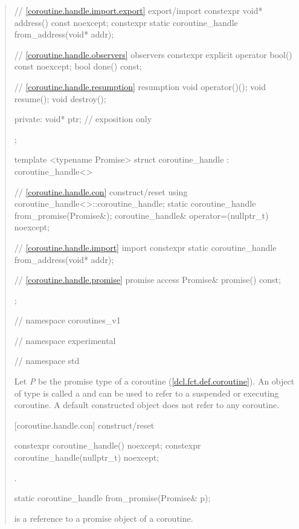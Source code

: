 \begin{quote}
\begin{codeblock}
{{{{    // \ref{coroutine.handle.import.export} export/import
    constexpr void* address() const noexcept;
    constexpr static coroutine_handle from_address(void* addr);
    
    // \ref{coroutine.handle.observers} observers
    constexpr explicit operator bool() const noexcept;
    bool done() const; 
    
    // \ref{coroutine.handle.resumption} resumption
    void operator()();
    void resume();	
    void destroy();
    
  private:
    void* ptr; // exposition only
  };

  template <typename Promise>
  struct coroutine_handle : coroutine_handle<>
  {
    // \ref{coroutine.handle.con} construct/reset
    using coroutine_handle<>::coroutine_handle;
    static coroutine_handle from_promise(Promise&);		
    coroutine_handle& operator=(nullptr_t) noexcept;

    // \ref{coroutine.handle.import} import
    constexpr static coroutine_handle from_address(void* addr);
    
    // \ref{coroutine.handle.promise} promise access
    Promise& promise() const;
  };

} // namespace coroutines_v1
} // namespace experimental
} // namespace std
\end{codeblock}

\pnum
Let \textit{P} be the promise type of a coroutine (\ref{dcl.fct.def.coroutine}). An object of type  is called a 
and can be used to refer to a suspended or executing coroutine.
A default constructed  object does not refer to any coroutine.



[coroutine.handle.con]{ construct/reset}
\begin{itemdecl}
  constexpr coroutine_handle() noexcept;		
  constexpr coroutine_handle(nullptr_t) noexcept;
\end{itemdecl}
\begin{itemdescr}
  \pnum\postconditions {}.
\end{itemdescr}

\begin{itemdecl}
  static coroutine_handle from_promise(Promise& p);
\end{itemdecl}
\begin{itemdescr}
  \pnum
  \precondition {} is a reference to a promise object of a coroutine.
  

\end{itemdescr}
\end{quote}
